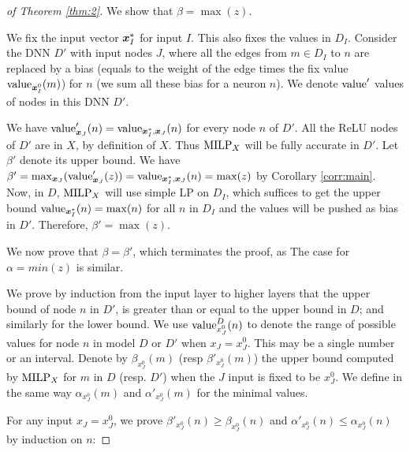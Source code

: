 			
\begin{proof}[of Theorem \ref{thm:2}]
	We show that $\beta=\max(z)$.

	We fix the input vector $\boldsymbol{x}^*_I$ for input $I$.
	This also fixes the values in $D_I$.
	Consider the DNN $D'$ with input nodes $J$, where all the 
	edges from $m \in D_I$ to $n$ are replaced by a bias (equals to the weight of the edge times the fix value ${\textrm{value}}_{\boldsymbol{x}^0_I}(m)$) for $n$ (we sum all these bias for a neuron $n$).
	We denote ${\textrm{value}}'$ values of nodes in this DNN $D'$.
		 
	We have ${\textrm{value}}'_{\boldsymbol{x}_J}(n)={\textrm{value}}_{\boldsymbol{x}^*_I,\boldsymbol{x}_J}(n)$ 
	for every node $n$ of $D'$. All the ReLU nodes of $D'$ are in $X$, by definition of $X$.
Thus ${\textrm{MILP}}_X$ will be fully accurate in $D'$. Let $\beta'$ denote its upper bound.
We have $\beta'=\max_{\boldsymbol{x}{_J}} ({\textrm{value}}'_{\boldsymbol{x}_{J}}(z)) = 
{\textrm{value}}_{\boldsymbol{x}^*_I,\boldsymbol{x}_J}(n) = \max(z)$ by Corollary \ref{corr:main}.
Now, in $D$, ${\textrm{MILP}}_X$ will use simple LP on $D_I$, which suffices to get the upper bound ${\textrm{value}}_{\boldsymbol{x}^*_I}(n)=\max(n)$ for all $n$ in $D_I$ and the values will be pushed as bias in $D'$. Therefore, $\beta'=\max(z)$.

We now prove that $\beta=\beta'$, which terminates the proof, as The case for $\alpha=min(z)$ is similar. 

We prove by induction from the input layer to higher layers that the upper bound of node $n$ in $D'$, is greater than or equal to the upper bound in $D$; and similarly for the lower bound. We use  ${\textrm{value}}^{D}_{x_J^0}(n)$ to denote the range of possible values for node $n$ in  model $D$ or $D'$ when $x_J=x_J^0$. 
This may be a single number or an interval. 
Denote by $\beta_{x_J^0}(m)$ (resp $\beta'_{x_J^0}(m)$) the upper bound computed by ${\textrm{MILP}}_X$ 
for $m$ in $D$ (resp. $D'$) when the $J$ input is fixed to be ${x_J^0}$.
We define in the same way  $\alpha_{x_J^0}(m)$ and $\alpha'_{x_J^0}(m)$ for the minimal values.

For any input $x_J=x_J^0$, we prove $\beta'_{x_J^0}(n) \geq \beta_{x_J^0}(n)$ 
and
$\alpha'_{x_J^0}(n) \leq \alpha_{x_J^0}(n)$ 
by induction on $n$:



\end{proof}
